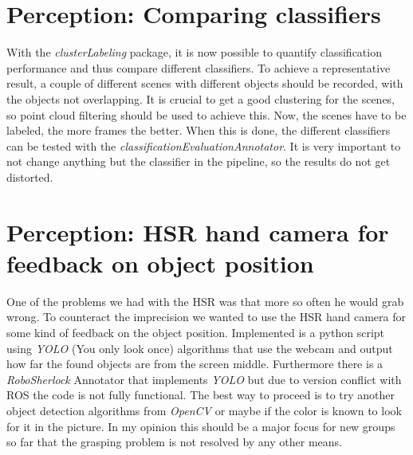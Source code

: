 \documentclass[main.tex]{subfiles}
\begin{document}
		\section{Perception: Comparing classifiers}
		With the \textit{clusterLabeling} package, it is now possible to quantify classification performance and thus compare different classifiers. To achieve a 					representative result, a couple of different scenes with different objects should be recorded, with the objects not overlapping. It is crucial to get a
		good clustering for the scenes, so point cloud filtering should be used to achieve this. Now, the scenes have to be labeled, the more frames the better. 
		When this is done, the different classifiers can be tested with the \textit{classificationEvaluationAnnotator}. It is very important to not change anything but 
		the classifier in the pipeline, so the results do not get distorted.
		
		\section{Perception: HSR hand camera for feedback on object position}
One of the problems we had with the HSR was that more so often he would grab wrong.
To counteract the imprecision we wanted to use the HSR hand camera for some kind of feedback on the object position.
Implemented is a python script using \textit{YOLO} (You only look once) algorithms that use the webcam and output how far the found objects are from the screen middle.
Furthermore there is a \textit{RoboSherlock} Annotator that implements \textit{YOLO} but due to version conflict with ROS the code is not fully functional.
The best way to proceed is to try another object detection algorithms from \textit{OpenCV} or maybe if the color is known to look for it in the picture.
In my opinion this should be a major focus for new groups so far that the grasping problem is not resolved by any other means.

\end{document}
